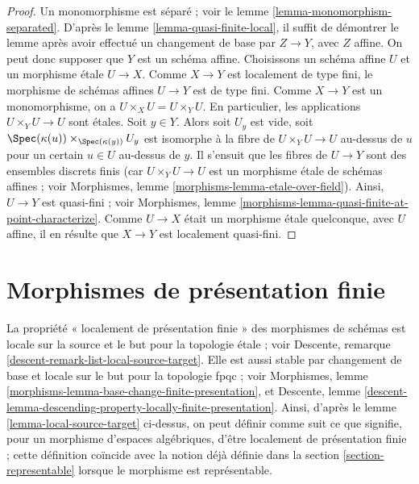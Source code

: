 \begin{proof}
Un monomorphisme est séparé ; voir le
lemme \ref{lemma-monomorphism-separated}.
D'après le
lemme \ref{lemma-quasi-finite-local},
il suffit de démontrer le lemme après avoir effectué un changement de base
par $Z \to Y$, avec $Z$ affine. On peut donc supposer que $Y$ est un
schéma affine. Choisissons un schéma affine $U$ et un morphisme étale
$U \to X$. Comme $X \to Y$ est localement de type fini, le morphisme
de schémas affines $U \to Y$ est de type fini.
Comme $X \to Y$ est un monomorphisme, on a $U \times_X U = U \times_Y U$.
En particulier, les applications $U \times_Y U \to U$ sont étales.
Soit $y \in Y$. Alors soit $U_y$ est vide, soit
$\Spec(\kappa(u)) \times_{\Spec(\kappa(y))} U_y$
est isomorphe à la fibre de $U \times_Y U \to U$ au-dessus de $u$ pour
un certain $u \in U$ au-dessus de $y$. Il s'ensuit que les fibres de
$U \to Y$ sont des ensembles discrets finis (car $U \times_Y U \to U$
est un morphisme étale de schémas affines ; voir
Morphismes, lemme \ref{morphisms-lemma-etale-over-field}).
Ainsi, $U \to Y$ est quasi-fini ; voir
Morphismes, lemme \ref{morphisms-lemma-quasi-finite-at-point-characterize}.
Comme $U \to X$ était un morphisme étale quelconque, avec $U$ affine,
il en résulte que $X \to Y$ est localement quasi-fini.
\end{proof}













\section{Morphismes de présentation finie}
\label{section-finite-presentation}

\noindent
La propriété « localement de présentation finie » des morphismes de schémas est
locale sur la source et le but pour la topologie étale ; voir
Descente, remarque \ref{descent-remark-list-local-source-target}.
Elle est aussi stable par changement de base et locale sur le but pour la topologie fpqc ; voir
Morphismes, lemme \ref{morphisms-lemma-base-change-finite-presentation}, et
Descente,
lemme \ref{descent-lemma-descending-property-locally-finite-presentation}.
Ainsi, d'après le
lemme \ref{lemma-local-source-target}
ci-dessus, on peut définir comme suit ce que signifie, pour un morphisme
d'espaces algébriques, d'être localement de présentation
finie ; cette définition coïncide avec la notion déjà définie dans la
section \ref{section-representable}
lorsque le morphisme est représentable.

